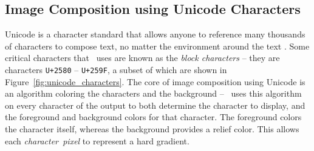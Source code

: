 \subsection{Image Composition using Unicode Characters}
\label{ch:intro:overview:unicode}

Unicode is a character standard that allows anyone to reference many thousands of characters to compose text, no matter the environment around the text \cite{unicode}.
Some critical characters that \name\ uses are known as the {\it block characters} -- they are characters \texttt{U+2580} -- \texttt{U+259F}, a subset of which are shown in Figure~\ref{fig:unicode_characters}.
The core of image composition using Unicode is an algorithm coloring the characters and the background -- \name\ uses this algorithm on every character of the output to both determine the character to display, and the foreground and background colors for that character.
The foreground colors the character itself, whereas the background provides a relief color.
This allows each {\it character~pixel} to represent a hard gradient.

